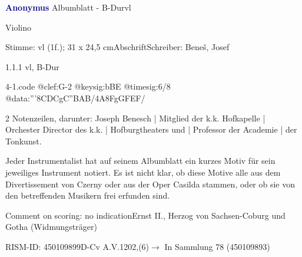 \documentclass[a4paper, twocolumn, 11pt]{book}
\begin{document}
\par \vspace{16pt} \textcolor{darkblue}{\textbf{Anonymus  }}\hfillplus{[4]}\newline Albumblatt - B-Dur\newline vl
\par \begin{itshape}[heading:] Violino\end{itshape} 
\par \textcolor{darkblue}{}  Stimme: vl  (1f.); 31 x 24,5 cm\newline Abschrift\newline Schreiber: Beneš, Josef
\par 1.1.1  vl, B-Dur  
\begin{filecontents*}{4-1.code}
@clef:G-2
@keysig:bBE
@timesig:6/8
@data:'''8{CDC}gC{''BAB}/4A8FgG{FEF}/
\end{filecontents*}
\newline %
\par 2 Notenzeilen, darunter: Joseph Benesch | Mitglied der k.k. Hofkapelle | Orchester Director des k.k. | Hofburgtheaters und | Professor der Academie | der Tonkunst.
\par Jeder Instrumentalist hat auf seinem Albumblatt ein kurzes Motiv für sein jeweiliges Instrument notiert. Es ist nicht klar, ob diese Motive alle aus dem {\textquotedbl}Divertissement{\textquotedbl} von Czerny oder aus der Oper {\textquotedbl}Casilda{\textquotedbl} stammen, oder ob sie von den betreffenden Musikern frei erfunden sind.
\par Comment on scoring: no indication\newline Ernst II., Herzog von Sachsen-Coburg und Gotha  (Widmungsträger)
\par RISM-ID: 450109899\newline D-Cv  A.V.1202,(6)\newline $\rightarrow$ In Sammlung 78 (450109893)
      
\end{document}
